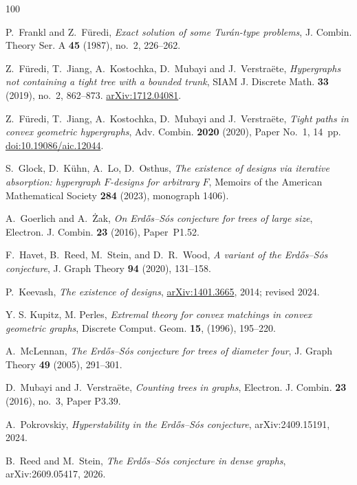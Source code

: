 \documentclass[11pt]{article}
\theoremstyle{remark}
\numberwithin{equation}{section}
\begin{document}
\begin{thebibliography}{100}
		
		
		P.~Frankl and Z.~F\"uredi,
		\emph{Exact solution of some Tur\'an-type problems}, J. Combin. Theory Ser. A \textbf{45} (1987), no.~2, 226--262.
		
		Z.~F\"uredi, T.~Jiang, A.~Kostochka, D.~Mubayi and J.~Verstra\"ete,
		\emph{Hypergraphs not containing a tight tree with a bounded trunk},
		SIAM J. Discrete Math. \textbf{33} (2019), no.~2, 862--873.
		\href{https://arxiv.org/abs/1712.04081}{arXiv:1712.04081}.
		
		Z.~F\"uredi, T.~Jiang, A.~Kostochka, D.~Mubayi and J.~Verstra\"ete,
		\emph{Tight paths in convex geometric hypergraphs},
		Adv. Combin. \textbf{2020} (2020), Paper No.~1, 14~pp.
		\href{https://doi.org/10.19086/aic.12044}{doi:10.19086/aic.12044}.
		
		 S.~Glock, D.~K\"{u}hn, A.~Lo, D.~Osthus, \emph{The existence of designs via iterative absorption: hypergraph $F$-designs for arbitrary $F$}, Memoirs of the American Mathematical Society \textbf{284} (2023), monograph 1406).
		
		
		 A.~Goerlich and A.~\.{Z}ak, \emph{On Erd{\H{o}}s--S{\'o}s conjecture for trees of large size}, Electron. J. Combin. \textbf{23} (2016), Paper~P1.52. 
		
		 F.~Havet, B.~Reed, M.~Stein, and D.~R.~Wood, \emph{A variant of the Erd{\H{o}}s--S{\'o}s conjecture}, J. Graph Theory \textbf{94} (2020), 131--158.
		
		
		P.~Keevash,
		\emph{The existence of designs},
		\href{https://arxiv.org/abs/1401.3665}{arXiv:1401.3665}, 2014;
		revised 2024.
		
		 Y. S. Kupitz, M. Perles, \emph{Extremal theory for convex matchings in convex geometric graphs}, Discrete Comput. Geom. \textbf{15}, (1996), 195--220. 
		
		
		 A.~McLennan, \emph{The Erd{\H{o}}s--S{\'o}s conjecture for trees of diameter four}, J. Graph Theory \textbf{49} (2005), 291--301.
		
		 D.~Mubayi and J.~Verstra\"ete, \emph{Counting trees in graphs}, Electron. J. Combin. \textbf{23} (2016), no.~3, Paper P3.39.
		
		 A.~Pokrovskiy, \emph{Hyperstability in the Erd{\H{o}}s--S{\'o}s conjecture}, arXiv:2409.15191, 2024. 
		
		 B.~Reed and M.~Stein, \emph{The Erd{\H{o}}s--S{\'o}s conjecture in dense graphs}, arXiv:2609.05417, 2026. 
		

\end{thebibliography}
\end{document}
